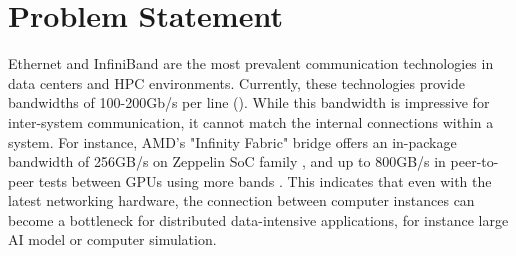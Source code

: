 \section{Problem Statement}\label{sec:introduction:problem_statement}
Ethernet and InfiniBand are the most prevalent communication technologies in data centers and \ac{HPC} environments. 
Currently, these technologies provide bandwidths of 100-200Gb/s per line \cite{ethernet_roadmap}\cite{infiniband_roadmap} (). 
While this bandwidth is impressive for inter-system communication, it cannot match the internal connections within a system. 
For instance, AMD's "Infinity Fabric" bridge offers an in-package bandwidth of 256GB/s on Zeppelin SoC family \cite{burd_zeppelin_2019}, and up to 800GB/s in peer-to-peer tests between GPUs using more bands \cite{amd_infinity_architecture}.
This indicates that even with the latest networking hardware, the connection between computer instances can become a bottleneck for distributed data-intensive applications, for instance large \ac{AI} model or computer simulation. 
